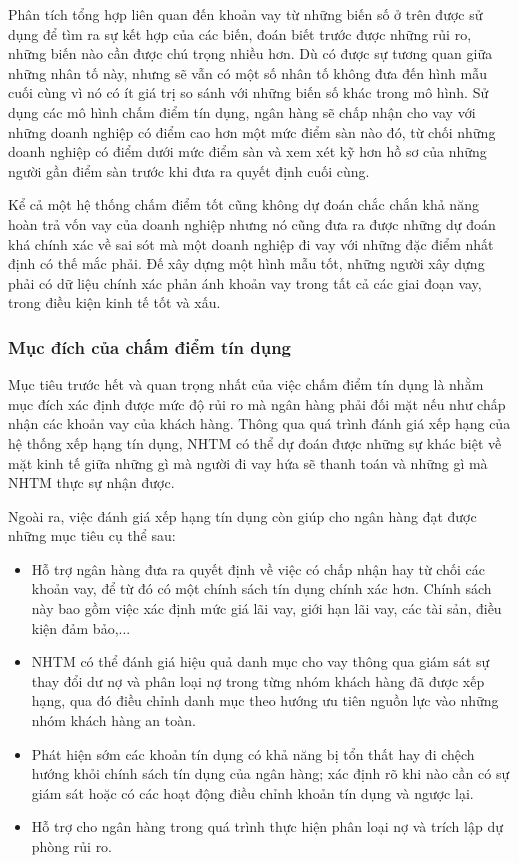 Phân tích tổng hợp liên quan đến khoản vay từ những biến số ở trên được sử dụng để tìm ra sự kết hợp của các biến, đoán biết trước được những rủi ro, những biến nào cần được chú trọng nhiều hơn. Dù có được sự tương quan giữa những nhân tố này, nhưng sẽ vẫn có một số nhân tố không đưa đến hình mẫu cuối cùng vì nó có ít giá trị so sánh với những biến số khác trong mô hình. Sử dụng các mô hình chấm điểm tín dụng, ngân hàng sẽ chấp nhận cho vay với những doanh nghiệp có điểm cao hơn một mức điểm sàn nào đó, từ chối những doanh nghiệp có điểm dưới mức điểm sàn và xem xét kỹ hơn hồ sơ của những người gần điểm sàn trước khi đưa ra quyết định cuối cùng. 

Kể cả một hệ thống chấm điểm tốt cũng không dự đoán chắc chắn khả năng hoàn trả vốn vay của doanh nghiệp nhưng nó cũng đưa ra được những dự đoán khá chính xác về sai sót mà một doanh nghiệp đi vay với những đặc điểm nhất định có thế mắc phải. Đế xây dựng một hình mẫu tốt, những người xây dựng phải có dữ liệu chính xác phản ánh khoản vay trong tất cả các giai đoạn vay, trong điều kiện kinh tế tốt và xấu.

\subsubsection{Mục đích của chấm điểm tín dụng}
Mục tiêu trước hết và quan trọng nhất của việc chấm điểm tín dụng là nhằm mục đích xác định được mức độ rủi ro mà ngân hàng phải đối mặt nếu như chấp nhận các khoản vay của khách hàng. Thông qua quá trình đánh giá xếp hạng của hệ thống xếp hạng tín dụng, NHTM có thể dự đoán được những sự khác biệt về mặt kinh tế giữa những gì mà người đi vay hứa sẽ thanh toán và những gì mà NHTM thực sự nhận được. 

Ngoài ra, việc đánh giá xếp hạng tín dụng còn giúp cho ngân hàng đạt được những mục tiêu cụ thể sau: 

\begin{itemize}
\item Hỗ trợ ngân hàng đưa ra quyết định về việc có chấp nhận hay từ chối các khoản vay, để từ đó có một chính sách tín dụng chính xác hơn. Chính sách này bao gồm việc xác định mức giá lãi vay, giới hạn lãi vay, các tài sản, điều kiện đảm bảo,... 
\item NHTM có thể đánh giá hiệu quả danh mục cho vay thông qua giám sát sự thay đổi dư nợ và phân loại nợ trong từng nhóm khách hàng đã được xếp hạng, qua đó điều chỉnh danh mục theo hướng ưu tiên nguồn lực vào những nhóm khách hàng an toàn. 
\item Phát hiện sớm các khoản tín dụng có khả năng bị tổn thất hay đi chệch hướng khỏi chính sách tín dụng của ngân hàng; xác định rõ khi nào cần có sự giám sát 
hoặc có các hoạt động điều chỉnh khoản tín dụng và ngược lại. 
\item Hỗ trợ cho ngân hàng trong quá trình thực hiện phân loại nợ và trích lập dự phòng rủi ro.
\end{itemize}
